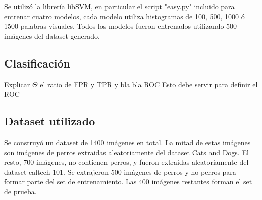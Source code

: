 \documentclass[12pt]{article}
\begin{document}

Se utilizó la librería libSVM, en particular el script "easy.py" incluido para entrenar cuatro modelos, cada modelo utiliza histogramas de 100, 500, 1000 ó 1500
palabras visuales. Todos los modelos fueron entrenados utilizando 500 imágenes del dataset generado.

\subsection{Clasificación}

Explicar $\Theta$ el ratio de FPR y TPR y bla bla ROC
Esto debe servir para definir el ROC

\subsection{Dataset utilizado}
Se construyó un dataset de 1400 imágenes en total. La mitad de estas imágenes son imágenes de perros extraidas aleatoriamente del dataset Cats and Dogs. 
El resto, 700 imágenes, no contienen perros, y fueron extraidas aleatoriamente del dataset caltech-101.
Se extrajeron 500 imágenes de perros y no-perros para formar parte del set de entrenamiento.
Las 400 imágenes restantes forman el set de prueba.
\end{document}
